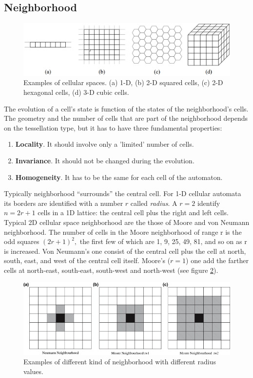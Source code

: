 \subsection{Neighborhood}
\begin{figure}
\centering
\caption{Examples of cellular spaces. (a) 1-D, (b) 2-D squared cells,
(c) 2-D hexagonal cells, (d) 3-D cubic cells.}\label{spazioCellulare}
\includegraphics[scale=0.3]{./images/spazioCellulare}
\end{figure}
The evolution of a cell's state is function of the states of the neighborhood's
cells. The geometry and the number of cells that are part of the neighborhood
depends on the tessellation type, but it has to have three fundamental
properties:
\begin{enumerate}
  \item \textbf{Locality}. It should involve only a 'limited' number of cells.
  \item \textbf{Invariance}. It should not be changed during the evolution.
  \item \textbf{Homogeneity}. It has to be the same for each cell of the
  automaton.
\end{enumerate}
Typically neighborhood ``surrounds'' the central cell. For 1-D cellular automata
its borders are identified with a number $r $ called
\textit{radius}\cite{wolfram1983}. A $r=2$ identify
$n=2r+1$ cells in a 1D lattice: the central cell plus the
right and left cells. Typical 2D cellular space neighborhood are the those of
Moore and von Neumann neighborhood. The number of cells in the Moore
neighborhood of range r is the odd squares $(2r+1)^2,$ the
first few of which are 1, 9, 25, 49, 81, and so on as r is increased.
Von Neumann's one consist of the central cell plus the cell at north, south,
east, and west of the central cell itself. Moore's ($r=1$)
one add  the farther cells at north-east, south-east, south-west and north-west
(see figure \ref{mooreNeigh}).



\begin{figure}
\centering
\caption{Examples of different kind of neighborhood with
different radius values.}\label{mooreNeigh}
\includegraphics[scale=0.9]{./images/mooreNeigh}
\end{figure}

